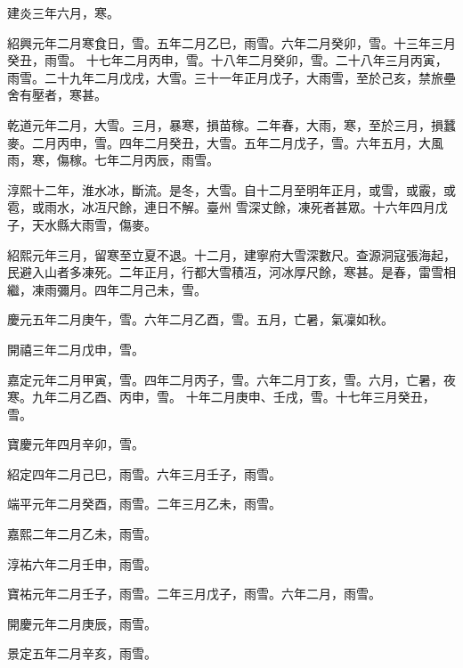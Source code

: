 \begin{pinyinscope}
 建炎三年六月，寒。



 紹興元年二月寒食日，雪。五年二月乙巳，雨雪。六年二月癸卯，雪。十三年三月癸丑，雨雪。
 十七年二月丙申，雪。十八年二月癸卯，雪。二十八年三月丙寅，雨雪。二十九年二月戊戌，大雪。三十一年正月戊子，大雨雪，至於己亥，禁旅壘舍有壓者，寒甚。



 乾道元年二月，大雪。三月，暴寒，損苗稼。二年春，大雨，寒，至於三月，損蠶麥。二月丙申，雪。四年二月癸丑，大雪。五年二月戊子，雪。六年五月，大風雨，寒，傷稼。七年二月丙辰，雨雪。



 淳熙十二年，淮水冰，斷流。是冬，大雪。自十二月至明年正月，或雪，或霰，或雹，或雨水，冰冱尺餘，連日不解。臺州
 雪深丈餘，凍死者甚眾。十六年四月戊子，天水縣大雨雪，傷麥。



 紹熙元年三月，留寒至立夏不退。十二月，建寧府大雪深數尺。查源洞寇張海起，民避入山者多凍死。二年正月，行都大雪積冱，河冰厚尺餘，寒甚。是春，雷雪相繼，凍雨彌月。四年二月己未，雪。



 慶元五年二月庚午，雪。六年二月乙酉，雪。五月，亡暑，氣凜如秋。



 開禧三年二月戊申，雪。



 嘉定元年二月甲寅，雪。四年二月丙子，雪。六年二月丁亥，雪。六月，亡暑，夜寒。九年二月乙酉、丙申，雪。
 十年二月庚申、壬戌，雪。十七年三月癸丑，雪。



 寶慶元年四月辛卯，雪。



 紹定四年二月己巳，雨雪。六年三月壬子，雨雪。



 端平元年二月癸酉，雨雪。二年三月乙未，雨雪。



 嘉熙二年二月乙未，雨雪。



 淳祐六年二月壬申，雨雪。



 寶祐元年二月壬子，雨雪。二年三月戊子，雨雪。六年二月，雨雪。



 開慶元年二月庚辰，雨雪。



 景定五年二月辛亥，雨雪。




\end{pinyinscope}
